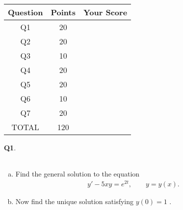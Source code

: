 \documentclass[12pt, oneside]{amsart}
\newcommand{\one}{20}
\newcommand{\two}{20}
\newcommand{\three}{10}
\newcommand{\four}{20}
\newcommand{\five}{20}
\newcommand{\six}{10}
\newcommand{\seven}{20}
\begin{document}
\begin{center}
    {\large
        \begin{tabular}{|c|c|c|}
            \hline
            \rule[-0.3cm]{0cm}{1cm}
            \textsf{Question} & \textsf{Points} &  \textsf{Your Score} \\
            \hline
            \hline
            \rule[-0.3cm]{0cm}{1cm}
            \textsf{Q1} & \one &\\
            \hline
            \rule[-0.3cm]{0cm}{1cm}
            \textsf{Q2} & \two &\\
            \hline
            \rule[-0.3cm]{0cm}{1cm}
            \textsf{Q3} & \three &\\
            \hline
            \rule[-0.3cm]{0cm}{1cm}
            \textsf{Q4} & \four &\\
            \hline
            \rule[-0.3cm]{0cm}{1cm}
            \textsf{Q5} & \five &\\
            \hline
            \rule[-0.3cm]{0cm}{1cm}
            \textsf{Q6} & \six &\\
            \hline
                        \rule[-0.3cm]{0cm}{1cm}
            \textsf{Q7} & \seven &\\
            \hline
            \rule[-0.3cm]{0cm}{1cm}
            \textsf{TOTAL} & 120 & \\
            \hline
        \end{tabular}
    } 

\end{center}

\vfill


\newpage
\noindent
\textbf{Q1}. \\ \\ 
\begin{enumerate}[a)]
    \item
Find the general solution to the equation
\begin{equation*}
\begin{split}
y' - 5xy = e^{2t}, \qquad y = y(x).
\end{split}
\end{equation*}


\vspace{5in}
\item
    Now find the unique solution satisfying $y(0) = 1$ .
\end{enumerate}
\end{document}
